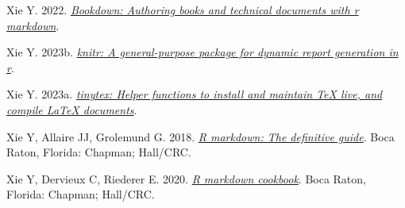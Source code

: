 \documentclass[10pt,a4paper]{article}
\newlength{\cslhangindent}
\newlength{\cslentryspacingunit} %
\newenvironment{CSLReferences}[2] %
 {%
  \setlength{\parindent}{0pt}
  \ifodd #1
  \let\oldpar\par
  \def\par{\hangindent=\cslhangindent\oldpar}
  \fi
  \setlength{\parskip}{#2\cslentryspacingunit}
 }%
 {}
\begin{document}
\begin{CSLReferences}{1}{0}
\leavevmode{}%
Xie Y. 2022. \emph{\href{https://CRAN.R-project.org/package=bookdown}{Bookdown: Authoring books and technical documents with r markdown}}.

\leavevmode{}%
Xie Y. 2023b. \emph{\href{https://yihui.org/knitr/}{{knitr}: A general-purpose package for dynamic report generation in r}}.

\leavevmode{}%
Xie Y. 2023a. \emph{\href{https://github.com/rstudio/tinytex}{{tinytex}: Helper functions to install and maintain TeX live, and compile LaTeX documents}}.

\leavevmode{}%
Xie Y, Allaire JJ, Grolemund G. 2018. \emph{\href{https://bookdown.org/yihui/rmarkdown}{R markdown: The definitive guide}}. Boca Raton, Florida: Chapman; Hall/CRC.

\leavevmode{}%
Xie Y, Dervieux C, Riederer E. 2020. \emph{\href{https://bookdown.org/yihui/rmarkdown-cookbook}{R markdown cookbook}}. Boca Raton, Florida: Chapman; Hall/CRC.

\end{CSLReferences}
\end{document}
